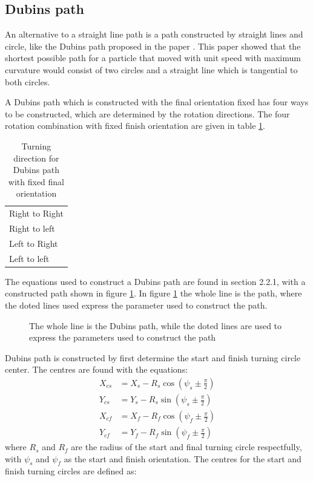 \subsection{Dubins path}\label{S:DubinsPath}
An alternative to a straight line path is a path constructed by straight lines and circle, like the Dubins path proposed in the paper \citep{dubins1957curves}. This paper showed that the shortest possible path for a particle that moved with unit speed with maximum curvature would consist of two circles and a straight line which is tangential to both circles.

A Dubins path which is constructed with the final orientation fixed has four ways to be constructed, which are determined by the rotation directions. The four rotation combination with fixed finish orientation are given in table \ref{Tb:DubinsTurningDirection}.
\begin{table}[H]
\centering
\begin{adjustbox}{max width=\textwidth}
\begin{tabular}{ | l |}
\hline
Right to Right \\
Right to left \\
Left to Right \\
Left to left \\ \hline
\end{tabular}
\end{adjustbox}
\caption{Turning direction for Dubins path with fixed final orientation}
\label{Tb:DubinsTurningDirection}
\end{table}
The equations used to construct a Dubins path are found in \citep{tsourdos2010cooperative} section 2.2.1, with a constructed path shown in figure \ref{Fig:DubinsPath}. In figure \ref{Fig:DubinsPath} the whole line is the path, where the doted lines used express the parameter used to construct the path.
\begin{figure}[H]
\def\svgwidth{\textwidth} %

\caption{The whole line is the Dubins path, while the doted lines are used to express the parameters used to construct the path}
\label{Fig:DubinsPath}
\end{figure}
Dubins path is constructed by first determine the start and finish turning circle center. The centres are found with the equations:
\begin{subequations}
\begin{align}
X_{cs} &= X_s - R_s\cos(\psi_s \pm \frac{\pi}{2}) \\
Y_{cs} &= Y_s - R_s\sin(\psi_s \pm \frac{\pi}{2}) \\
X_{cf} &= X_f - R_f\cos(\psi_f \pm \frac{\pi}{2}) \\
Y_{cf} &= Y_f - R_f\sin(\psi_f \pm \frac{\pi}{2})
\end{align}
\end{subequations}
where $R_s$ and $R_f$ are the radius of the start and final turning circle respectfully, with $\psi_s$ and $\psi_f$ as the start and finish orientation. The centres for the start and finish turning circles are defined as:

